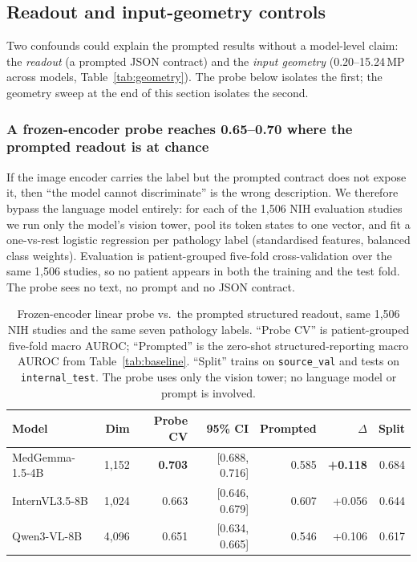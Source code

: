 \subsection{Readout and input-geometry controls}
\label{sec:results-controls}

Two confounds could explain the prompted results without a model-level claim: the
\emph{readout} (a prompted JSON contract) and the \emph{input geometry} (0.20--15.24\,MP
across models, Table~\ref{tab:geometry}). The probe below isolates the first; the
geometry sweep at the end of this section isolates the second.

\subsubsection{A frozen-encoder probe reaches 0.65--0.70 where the prompted readout is at chance}
\label{sec:results-probe}

If the image encoder carries the label but the prompted contract does not expose it, then
``the model cannot discriminate'' is the wrong description. We therefore bypass the
language model entirely: for each of the 1,506 NIH evaluation studies we run only the
model's vision tower, pool its token states to one vector, and fit a one-vs-rest logistic
regression per pathology label (standardised features, balanced class weights). Evaluation
is patient-grouped five-fold cross-validation over the same 1,506 studies, so no patient
appears in both the training and the test fold. The probe sees no text, no prompt and no
JSON contract.

\begin{table}[t]
\centering
\small
\caption{Frozen-encoder linear probe vs.\ the prompted structured readout, same 1,506 NIH
studies and the same seven pathology labels. ``Probe CV'' is patient-grouped five-fold
macro AUROC; ``Prompted'' is the zero-shot structured-reporting macro AUROC from
Table~\ref{tab:baseline}. ``Split'' trains on \texttt{source\_val} and tests on
\texttt{internal\_test}. The probe uses only the vision tower; no language model or prompt
is involved.}
\label{tab:probe}
\begin{tabular}{lrrrrrr}
\toprule
Model & Dim & Probe CV & 95\% CI & Prompted & $\Delta$ & Split \\
\midrule
MedGemma-1.5-4B & 1,152 & \textbf{0.703} & [0.688, 0.716] & 0.585 & \textbf{+0.118} & 0.684 \\
InternVL3.5-8B & 1,024 & 0.663 & [0.646, 0.679] & 0.607 & +0.056 & 0.644 \\
Qwen3-VL-8B & 4,096 & 0.651 & [0.634, 0.665] & 0.546 & +0.106 & 0.617 \\
\bottomrule
\end{tabular}
\end{table}

